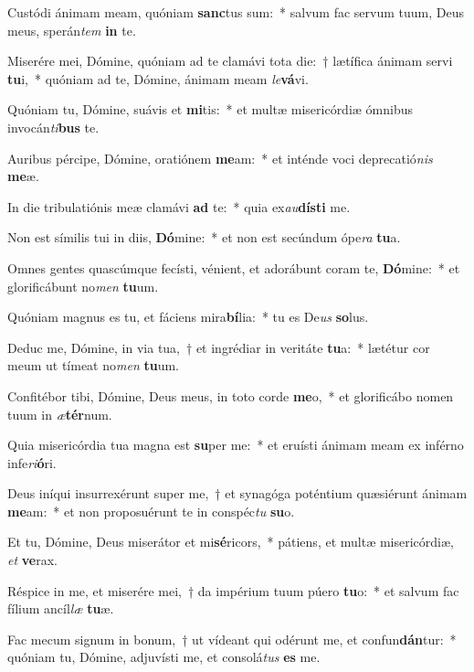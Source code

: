 \item Custódi ánimam meam, quóniam \textbf{sanc}tus sum:~* salvum fac servum tuum, Deus meus, sperán\textit{tem} \textbf{in} te.
\item Miserére mei, Dómine, quóniam ad te clamávi tota die:~† lætífica ánimam servi \textbf{tu}i,~* quóniam ad te, Dómine, ánimam meam \textit{le}\textbf{vá}vi.
\item Quóniam tu, Dómine, suávis et \textbf{mi}tis:~* et multæ misericórdiæ ómnibus invocán\textit{ti}\textbf{bus} te.
\item Auribus pércipe, Dómine, oratiónem \textbf{me}am:~* et inténde voci deprecatió\textit{nis} \textbf{me}æ.
\item In die tribulatiónis meæ clamávi \textbf{ad} te:~* quia ex\textit{au}\textbf{dís}\textbf{ti} me.
\item Non est símilis tui in diis, \textbf{Dó}mine:~* et non est secúndum ópe\textit{ra} \textbf{tu}a.
\item Omnes gentes quascúmque fecísti, vénient, et adorábunt coram te, \textbf{Dó}mine:~* et glorificábunt no\textit{men} \textbf{tu}um.
\item Quóniam magnus es tu, et fáciens mira\textbf{bí}lia:~* tu es De\textit{us} \textbf{so}lus.
\item Deduc me, Dómine, in via tua,~† et ingrédiar in veritáte \textbf{tu}a:~* lætétur cor meum ut tímeat no\textit{men} \textbf{tu}um.
\item Confitébor tibi, Dómine, Deus meus, in toto corde \textbf{me}o,~* et glorificábo nomen tuum in \textit{æ}\textbf{tér}num.
\item Quia misericórdia tua magna est \textbf{su}per me:~* et eruísti ánimam meam ex inférno infe\textit{ri}\textbf{ó}ri.
\item Deus iníqui insurrexérunt super me,~† et synagóga poténtium quæsiérunt ánimam \textbf{me}am:~* et non proposuérunt te in conspéc\textit{tu} \textbf{su}o.
\item Et tu, Dómine, Deus miserátor et mi\textbf{sé}ricors,~* pátiens, et multæ misericórdiæ, \textit{et} \textbf{ve}rax.
\item Réspice in me, et miserére mei,~† da impérium tuum púero \textbf{tu}o:~* et salvum fac fílium ancíl\textit{læ} \textbf{tu}æ.
\item Fac mecum signum in bonum,~† ut vídeant qui odérunt me, et confun\textbf{dán}tur:~* quóniam tu, Dómine, adjuvísti me, et consolá\textit{tus} \textbf{es} me.
